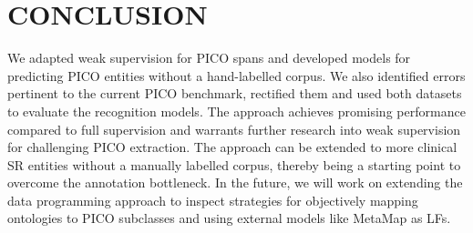 \documentclass[10.7pt,]{article}
\begin{document}
\section{CONCLUSION}\label{conclusion}
%
We adapted weak supervision for PICO spans and developed models for predicting PICO entities without a hand-labelled corpus.
We also identified errors pertinent to the current PICO benchmark, rectified them and used both datasets to evaluate the recognition models.
The approach achieves promising performance compared to full supervision and warrants further research into weak supervision for challenging PICO extraction.
The approach can be extended to more clinical SR entities without a manually labelled corpus, thereby being a starting point to overcome the annotation bottleneck.
In the future, we will work on extending the data programming approach to inspect strategies for objectively mapping ontologies to PICO subclasses and using external models like MetaMap as LFs.
%
%
%
\end{document}
